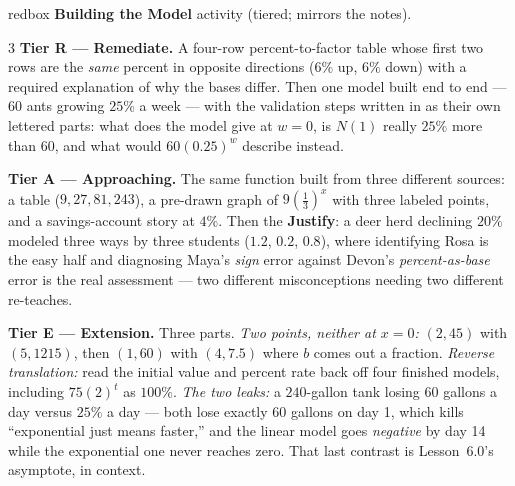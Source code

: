 \documentclass[10pt]{article}
\begin{document}
\begin{skillbox}{redbox}
\textbf{Building the Model} activity (tiered; mirrors the notes).
\begin{multicols}{3}
\textbf{Tier R --- Remediate.} A four-row percent-to-factor table whose first two rows are the
\emph{same} percent in opposite directions ($6\%$ up, $6\%$ down) with a required explanation of why
the bases differ. Then one model built end to end --- $60$ ants growing $25\%$ a week --- with the
validation steps written in as their own lettered parts: what does the model give at $w=0$, is
$N(1)$ really $25\%$ more than $60$, and what would $60(0.25)^{w}$ describe instead.

\columnbreak
\textbf{Tier A --- Approaching.} The same function built from three different sources: a table
($9,27,81,243$), a pre-drawn graph of $9\left(\frac13\right)^{x}$ with three labeled points, and a
savings-account story at $4\%$. Then the \textbf{Justify}: a deer herd declining $20\%$ modeled three
ways by three students ($1.2$, $0.2$, $0.8$), where identifying Rosa is the easy half and diagnosing
Maya's \emph{sign} error against Devon's \emph{percent-as-base} error is the real assessment ---
two different misconceptions needing two different re-teaches.

\columnbreak
\textbf{Tier E --- Extension.} Three parts. \emph{Two points, neither at $x=0$:} $(2,45)$ with
$(5,1215)$, then $(1,60)$ with $(4,7.5)$ where $b$ comes out a fraction. \emph{Reverse translation:}
read the initial value and percent rate back off four finished models, including $75(2)^{t}$ as
$100\%$. \emph{The two leaks:} a $240$-gallon tank losing $60$ gallons a day versus $25\%$ a day ---
both lose exactly $60$ gallons on day 1, which kills ``exponential just means faster,'' and the
linear model goes \emph{negative} by day 14 while the exponential one never reaches zero. That last
contrast is Lesson~6.0's asymptote, in context.
\end{multicols}
\end{skillbox}
\end{document}
